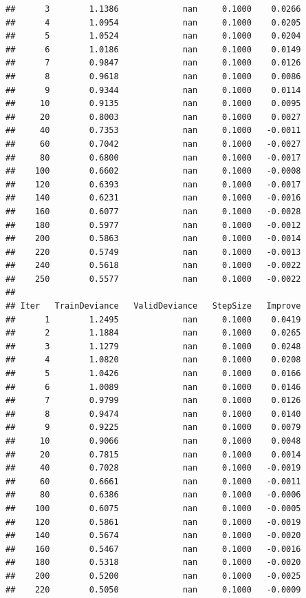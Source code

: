 \documentclass[
]{book}
\begin{document}
\begin{verbatim}
##      3        1.1386             nan     0.1000    0.0266
##      4        1.0954             nan     0.1000    0.0205
##      5        1.0524             nan     0.1000    0.0204
##      6        1.0186             nan     0.1000    0.0149
##      7        0.9847             nan     0.1000    0.0126
##      8        0.9618             nan     0.1000    0.0086
##      9        0.9344             nan     0.1000    0.0114
##     10        0.9135             nan     0.1000    0.0095
##     20        0.8003             nan     0.1000    0.0027
##     40        0.7353             nan     0.1000   -0.0011
##     60        0.7042             nan     0.1000   -0.0027
##     80        0.6800             nan     0.1000   -0.0017
##    100        0.6602             nan     0.1000   -0.0008
##    120        0.6393             nan     0.1000   -0.0017
##    140        0.6231             nan     0.1000   -0.0016
##    160        0.6077             nan     0.1000   -0.0028
##    180        0.5977             nan     0.1000   -0.0012
##    200        0.5863             nan     0.1000   -0.0014
##    220        0.5749             nan     0.1000   -0.0013
##    240        0.5618             nan     0.1000   -0.0022
##    250        0.5577             nan     0.1000   -0.0022
## 
## Iter   TrainDeviance   ValidDeviance   StepSize   Improve
##      1        1.2495             nan     0.1000    0.0419
##      2        1.1884             nan     0.1000    0.0265
##      3        1.1279             nan     0.1000    0.0248
##      4        1.0820             nan     0.1000    0.0208
##      5        1.0426             nan     0.1000    0.0166
##      6        1.0089             nan     0.1000    0.0146
##      7        0.9799             nan     0.1000    0.0126
##      8        0.9474             nan     0.1000    0.0140
##      9        0.9225             nan     0.1000    0.0079
##     10        0.9066             nan     0.1000    0.0048
##     20        0.7815             nan     0.1000    0.0014
##     40        0.7028             nan     0.1000   -0.0019
##     60        0.6661             nan     0.1000   -0.0011
##     80        0.6386             nan     0.1000   -0.0006
##    100        0.6075             nan     0.1000   -0.0005
##    120        0.5861             nan     0.1000   -0.0019
##    140        0.5674             nan     0.1000   -0.0020
##    160        0.5467             nan     0.1000   -0.0016
##    180        0.5318             nan     0.1000   -0.0020
##    200        0.5200             nan     0.1000   -0.0025
##    220        0.5050             nan     0.1000   -0.0009

\end{verbatim}
\end{document}
